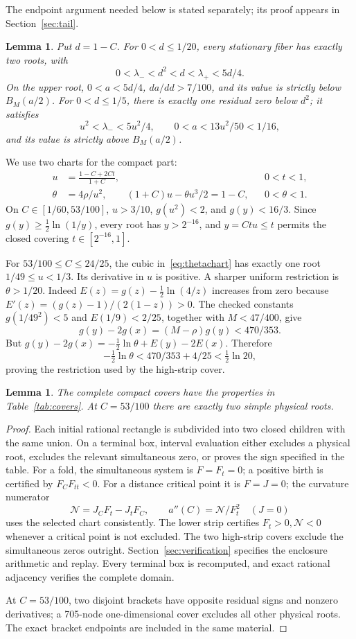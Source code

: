 \documentclass[12pt,letterpaper,onecolumn]{article}
\newtheorem{lemma}[theorem]{Lemma}
\theoremstyle{definition}
\begin{document}
The endpoint argument needed below is stated separately; its proof appears in Section~\ref{sec:tail}.
\begin{lemma}\label{lem:tail}
Put \(d=1-C\).
For \(0<d\le1/20\), every stationary fiber has exactly two roots, with
\[
0<\lambda_-<d^2<d<\lambda_+<5d/4.
\]
On the upper root, \(0<a<5d/4\), \(da/dd>7/100\), and its value is strictly below \(B_M(a/2)\).
For \(0<d\le1/5\), there is exactly one residual zero below \(d^2\); it satisfies
\[
u^2<\lambda_-<5u^2/4,\qquad
0<a<13u^2/50<1/16,
\]
and its value is strictly above \(B_M(a/2)\).
\end{lemma}

We use two charts for the compact part:
\begin{align}
u&=\frac{1-C+2Ct}{1+C},&&0<t<1,\label{eq:tchart}\\
\theta&=4\rho/u^2,\qquad
(1+C)u-\theta u^3/2=1-C,&&0<\theta<1.\label{eq:thetachart}
\end{align}
On \(C\in[1/60,53/100]\), \(u>3/10\), \(g(u^2)<2\), and
\(g(y)<16/3\). Since \(g(y)\ge\frac12\ln(1/y)\), every root has
\(y>2^{-16}\), and \(y=Ctu\le t\) permits the closed covering \(t\in[2^{-16},1]\).

For \(53/100\le C\le24/25\), the cubic in~\eqref{eq:thetachart} has exactly one root \(1/49\le u<1/3\). Its derivative in \(u\) is positive.
A sharper uniform restriction is \(\theta>1/20\).
Indeed \(E(z)=g(z)-\frac12\ln(4/z)\) increases from zero because
\(E'(z)=(g(z)-1)/(2(1-z))>0\).
The checked constants \(g(1/49^2)<5\) and \(E(1/9)<2/25\), together with \(M<47/400\), give
\[
g(y)-2g(x)=(M-\rho)g(y)<470/353.
\]
But \(g(y)-2g(x)=-\frac12\ln\theta+E(y)-2E(x)\).
Therefore
\[
-\tfrac12\ln\theta<470/353+4/25<\tfrac12\ln20,
\]
proving the restriction used by the high-strip cover.

\begin{lemma}\label{lem:covers}
The complete compact covers have the properties in Table~\ref{tab:covers}. At \(C=53/100\) there are exactly two simple physical roots.
\end{lemma}
\begin{proof}
Each initial rational rectangle is subdivided into two closed children with the same union. On a terminal box, interval evaluation either excludes a physical root, excludes the relevant simultaneous zero, or proves the sign specified in the table.
For a fold, the simultaneous system is \(F=F_t=0\); a positive birth is certified by \(F_CF_{tt}<0\).
For a distance critical point it is \(F=J=0\); the curvature numerator
\[
\mathcal N=J_CF_t-J_tF_C,\qquad a''(C)=\mathcal N/F_t^2
\quad(J=0)
\]
uses the selected chart consistently.
The lower strip certifies \(F_t>0,\mathcal N<0\) whenever a critical point is not excluded.
The two high-strip covers exclude the simultaneous zeros outright.
Section~\ref{sec:verification} specifies the enclosure arithmetic and replay.
Every terminal box is recomputed, and exact rational adjacency verifies the complete domain.

At \(C=53/100\), two disjoint brackets have opposite residual signs and nonzero derivatives; a 705-node one-dimensional cover excludes all other physical roots. The exact bracket endpoints are included in the same material.
\end{proof}
\end{document}
